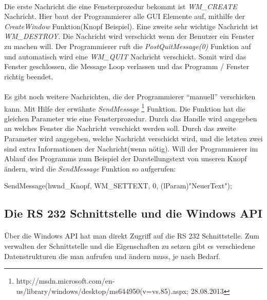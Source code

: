 \paragraph{}
Die erste Nachricht die eine Fensterprozedur bekommt ist \textit{WM\_CREATE} Nachricht. Hier baut der Programmierer alle GUI Elemente auf, mithilfe der \textit{CreateWindow} Funktion(Knopf Beispiel). Eine zweite sehr wichtige Nachricht ist \textit{WM\_DESTROY}. Die Nachricht wird verschickt wenn der Benutzer ein Fenster zu machen will. Der Programmierer ruft die \textit{PostQuitMessage(0)} Funktion auf und automatisch wird eine \textit{WM\_QUIT} Nachricht verschickt. Somit wird das Fenster geschlossen, die Message Loop verlassen und das Programm / Fenster richtig beendet.

\paragraph{}
Es gibt noch weitere Nachrichten, die der Programmierer "`manuell"' verschicken kann. Mit Hilfe der erwähnte \textit{SendMessage} \footnote{http://msdn.microsoft.com/en-us/library/windows/desktop/ms644950(v=vs.85).aspx; 28.08.2013} Funktion. Die Funktion hat die gleichen Parameter wie eine Fensterprozedur. Durch das Handle wird angegeben an welches Fenster die Nachricht verschickt werden soll. Durch das zweite Parameter wird angegeben, welche Nachricht verschickt wird, und die letzten zwei sind extra Informationen der Nachricht(wenn nötig). Will der Programmierer im Ablauf des Programms zum Beispiel der Darstellungstext von unseren Knopf ändern, wird die \textit{SendMessage} Funktion so aufgerufen:

\begin{center}
SendMessage(hwnd\_Knopf, WM\_SETTEXT, 0, (lParam)"NeuerText");
\end{center}

\subsection{Die RS 232 Schnittstelle und die Windows API}
\paragraph{}
Über die Windows API hat man direkt Zugriff auf die RS 232 Schnittstelle. Zum verwalten der Schnittstelle und die Eigenschaften zu setzen gibt es verschiedene Datenstrukturen die man aufrufen und ändern muss, je nach Bedarf.


